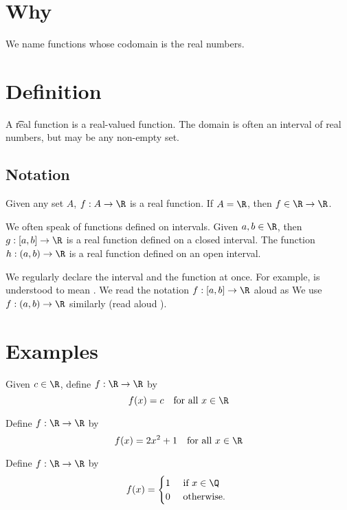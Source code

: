 

\section*{Why}

We name functions whose codomain is the real numbers.

\section*{Definition}

A \t{real function} is a real-valued function.
The domain is often an interval of real numbers, but may be any non-empty set.

\subsection*{Notation}

Given any set $A$, $f: A \to \R $ is a real function.
If $A = \R $, then $f \in \R  \to \R $.

We often speak of functions defined on intervals.
Given $a, b \in \R $, then $g: [a, b] \to \R $ is a real function defined on a closed interval.
The function $h: (a, b) \to \R $ is a real function defined on an open interval.

We regularly declare the interval and the function at once.
For example,  is understood to mean .
We read the notation $f: [a, b] \to \R $ aloud as 
We use $f: (a, b) \to \R $ similarly (read aloud ).

\section*{Examples}

\begin{example}
Given $c \in \R $, define $f: \R  \to \R $ by
  \[
f(x) = c \quad \text{for all } x \in \R
  \]\end{example}
\begin{example}
Define $f: \R  \to \R $ by
  \[
f(x) = 2x^2 + 1 \quad \text{for all } x \in \R
  \]\end{example}
\begin{example}
Define $f: \R  \to \R $ by
  \[
f(x) = \begin{cases}
1 & \text{ if } x \in \Q  \\
0 & \text{ otherwise. }
\end{cases}
  \]\end{example}